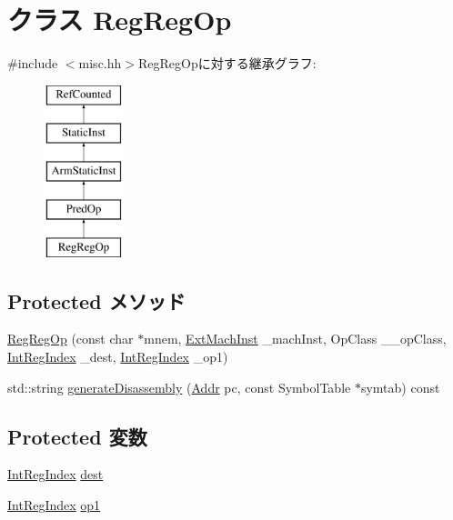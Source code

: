 \hypertarget{classRegRegOp}{
\section{クラス RegRegOp}
\label{classRegRegOp}
}


{\ttfamily \#include $<$misc.hh$>$}RegRegOpに対する継承グラフ:\begin{figure}[H]
\begin{center}
\leavevmode
\includegraphics[height=5cm]{classRegRegOp}
\end{center}
\end{figure}
\subsection*{Protected メソッド}
\begin{DoxyCompactItemize}
\item 
\hyperlink{classRegRegOp_a527e1afe774e82a1e976cf3146421d69}{RegRegOp} (const char $\ast$mnem, \hyperlink{classStaticInst_a5605d4fc727eae9e595325c90c0ec108}{ExtMachInst} \_\-machInst, OpClass \_\-\_\-opClass, \hyperlink{namespaceArmISA_ae64680ba9fb526106829d6bf92fc791b}{IntRegIndex} \_\-dest, \hyperlink{namespaceArmISA_ae64680ba9fb526106829d6bf92fc791b}{IntRegIndex} \_\-op1)
\item 
std::string \hyperlink{classRegRegOp_a95d323a22a5f07e14d6b4c9385a91896}{generateDisassembly} (\hyperlink{classm5_1_1params_1_1Addr}{Addr} pc, const SymbolTable $\ast$symtab) const 
\end{DoxyCompactItemize}
\subsection*{Protected 変数}
\begin{DoxyCompactItemize}
\item 
\hyperlink{namespaceArmISA_ae64680ba9fb526106829d6bf92fc791b}{IntRegIndex} \hyperlink{classRegRegOp_aec72e8e45bdc87abeeeb75d2a8a9a716}{dest}
\item 
\hyperlink{namespaceArmISA_ae64680ba9fb526106829d6bf92fc791b}{IntRegIndex} \hyperlink{classRegRegOp_a4c465c43ad568f8bcf8ae71480e9cfea}{op1}
\end{DoxyCompactItemize}


